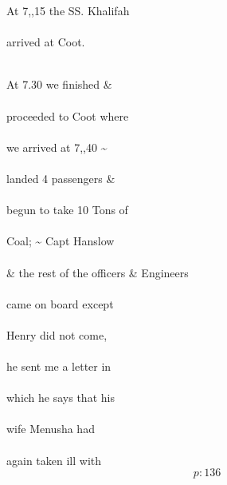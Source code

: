 \documentclass{report}
\begin{document}
	\par{
 	At 7,,15 the SS. Khalifah\ \\\ \\arrived at Coot.\ \\\ \\
	}

	\par{
 	At 7.30 we finished \&\ \\\ \\proceeded to Coot where\ \\\ \\we arrived at 7,,40 \~{}\ \\\ \\landed 4 passengers \&\ \\\ \\begun to take 10 Tons of\ \\\ \\Coal; \~{} Capt Hanslow\ \\\ \\\& the rest of the officers \& Engineers\ \\\ \\came on board except\ \\\ \\Henry did not come,\ \\\ \\he sent me a letter in\ \\\ \\which he says that his\ \\\ \\wife Menusha had\ \\\ \\again taken ill with\ \\
  \[p: 136 \]

	}
\end{document}
